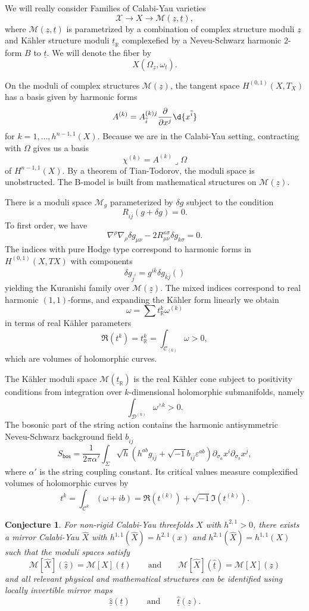\documentclass[10pt]{amsart}
\newtheorem{conj}[thm]{Conjecture}
\theoremstyle{definition}
\theoremstyle{remark}
\theoremstyle{plain}
\theoremstyle{definition}
\theoremstyle{remark}
\newcommand{\R}{\mathbb{R}}
\newcommand{\ep}{\varepsilon}
\newcommand{\mc}[1]{\mathcal{#1}}
\newcommand{\ut}{\ul{t}}
\newcommand{\uz}{\ul{z}}
\newcommand{\ms}[1]{\mathsf{#1}}
\newcommand{\ol}[1]{\overline{#1}}
\newcommand{\ul}[1]{\underline{#1}}
\newcommand{\1}{\mathbf{1}}
\newcommand{\2}{\mathbf{2}}
\newcommand{\3}{\mathbf{3}}
\begin{document}
We will really consider Families of Calabi-Yau varieties
\[ \mc{X} \to X \to \mc{M}(\uz, \ut), \]
where $\mc{M}(\uz, \ut)$ is parametrized by a combination of complex structure moduli $\uz$ and K\"ahler structure moduli $\ut_{\R}$ complexefied by a Neveu-Schwarz harmonic $2$-form $B$ to $\ut$. We will denote the fiber by
\[ X(\Omega_{\uz}, \omega_{\ut}). \]

On the moduli of complex structures $\mc{M}(\uz)$, the tangent space $H^{(0,1)}(X,T_X)$ has a basis given by harmonic forms
\[ A^{(k)} = A_{\ol{i}}^{(k) j} \pdv{}{x^j} \d{x^{\ol{i}}} \]
for $k = 1, \ldots, h^{n-1,1}(X)$. Because we are in the Calabi-Yau setting, contracting with $\Omega$ gives us a basis
\[ \chi^{(k)} = A^{(k)} \lrcorner \Omega \]
of $H^{n-1,1}(X)$. By a theorem of Tian-Todorov, the moduli space is unobstructed. The B-model is built from mathematical structures on $\mc{M}(\uz)$.

There is a moduli space $\mc{M}_g$ parameterized by $\delta g$ subject to the condition
\[ R_{i\ol{j}} (g+\delta g) = 0. \]
To first order, we have
\[ \nabla^{\rho} \nabla_{\rho} \delta g_{\mu\nu} - 2 R_{\mu\nu}^{\kappa\sigma} \delta g_{k\sigma} = 0. \]
The indices with pure Hodge type correspond to harmonic forms in $H^{(0,1)}(X, TX)$ with components
\[ \delta g_{\ol{j}^{i}} = g^{i\ol{k}} \delta g_{\ol{k}\ol{j}} () \]
yielding the Kuranishi family over $\mc{M}(\uz)$.
The mixed indices correspond to real harmonic $(1,1)$-forms, and expanding the K\"ahler form linearly we obtain
\[ \omega = \sum t_{\R}^k \omega^{(k)} \]
in terms of real K\"ahler parameters
\[  \Re(t^k) = t_{\R}^k = \int_{\mc{C}_{(k)}} \omega > 0, \] which are volumes of holomorphic curves.

The K\"ahler moduli space $\mc{M}(\ut_{\R})$ is the real K\"ahler cone subject to positivity conditions from integration over $k$-dimensional holomorphic submanifolds, namely
\[ \int_{\mc{D}^{(k)}} \omega^{\wedge k} > 0. \]
The bosonic part of the string action contains the harmonic antisymmetric Neveu-Schwarz background field $b_{i\ol{j}}$
\[ S_{\ms{bos}} =\frac{1}{2\pi\alpha'} \int_{\Sigma} \sqrt{h} (h^{ab} g_{i\ol{j}} + \sqrt{-1} b_{i\ol{j}}\ep^{ab}) \partial_{\sigma_a} x^i \partial_{\sigma_b} x^{ \ol{j} }, \]
where $\alpha'$ is the string coupling constant. Its critical values measure complexified volumes of holomorphic curves by
\[ t^k = \int_{\mc{C}^k} (\omega + ib) = \Re(t^(k)) + \sqrt{-1} \Im(t^{(k)}). \]


\begin{conj}
    For non-rigid Calabi-Yau threefolds $X$ with $h^{2,1} > 0$, there exists a mirror Calabi-Yau $\hat{X}$ with $h^{1,1}(\hat{X})= h^{2,1}(x)$ and $h^{2,1}(\hat{X}) = h^{1,1}(X)$ such that the moduli spaces satisfy
    \[ \mc{M}[\hat{X}](\hat{\uz}) = \mc{M}[X](\ut) \qquad \text{and} \qquad \mc{M}[\hat{X}](\hat{\ut}) = \mc{M}[X](\uz) \]
    and all relevant physical and mathematical structures can be identified using locally invertible mirror maps
    \[ \hat{\uz}(\ut) \qquad \text{and} \qquad \hat{\ut}(\uz). \]
\end{conj}
\end{document}
